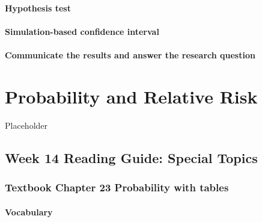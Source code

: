 \documentclass[
]{report}
\begin{document}
\hypertarget{hypothesis-test-4}{%
\subsubsection*{Hypothesis test}\label{hypothesis-test-4}}

\hypertarget{simulation-based-confidence-interval-1}{%
\subsubsection*{Simulation-based confidence interval}\label{simulation-based-confidence-interval-1}}

\hypertarget{communicate-the-results-and-answer-the-research-question-6}{%
\subsubsection*{Communicate the results and answer the research question}\label{communicate-the-results-and-answer-the-research-question-6}}

\hypertarget{probability-and-relative-risk}{%
\chapter{Probability and Relative Risk}\label{probability-and-relative-risk}}

Placeholder

\hypertarget{week-14-reading-guide-special-topics}{%
\section{Week 14 Reading Guide: Special Topics}\label{week-14-reading-guide-special-topics}}

\hypertarget{textbook-chapter-23-probability-with-tables}{%
\subsection*{Textbook Chapter 23 Probability with tables}\label{textbook-chapter-23-probability-with-tables}}

\hypertarget{vocabulary-19}{%
\subsubsection*{Vocabulary}\label{vocabulary-19}}
\end{document}
